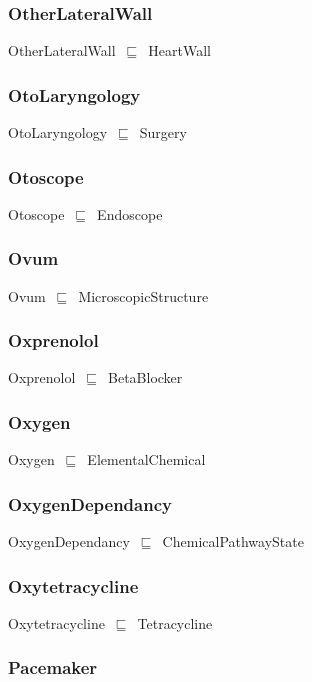 \documentclass{article}
\begin{document}
\subsubsection*{OtherLateralWall}

OtherLateralWall~\ensuremath{\sqsubseteq}~HeartWall~

\subsubsection*{OtoLaryngology}

OtoLaryngology~\ensuremath{\sqsubseteq}~Surgery~

\subsubsection*{Otoscope}

Otoscope~\ensuremath{\sqsubseteq}~Endoscope~

\subsubsection*{Ovum}

Ovum~\ensuremath{\sqsubseteq}~MicroscopicStructure~

\subsubsection*{Oxprenolol}

Oxprenolol~\ensuremath{\sqsubseteq}~BetaBlocker~

\subsubsection*{Oxygen}

Oxygen~\ensuremath{\sqsubseteq}~ElementalChemical~

\subsubsection*{OxygenDependancy}

OxygenDependancy~\ensuremath{\sqsubseteq}~ChemicalPathwayState~

\subsubsection*{Oxytetracycline}

Oxytetracycline~\ensuremath{\sqsubseteq}~Tetracycline~

\subsubsection*{Pacemaker}
\end{document}
